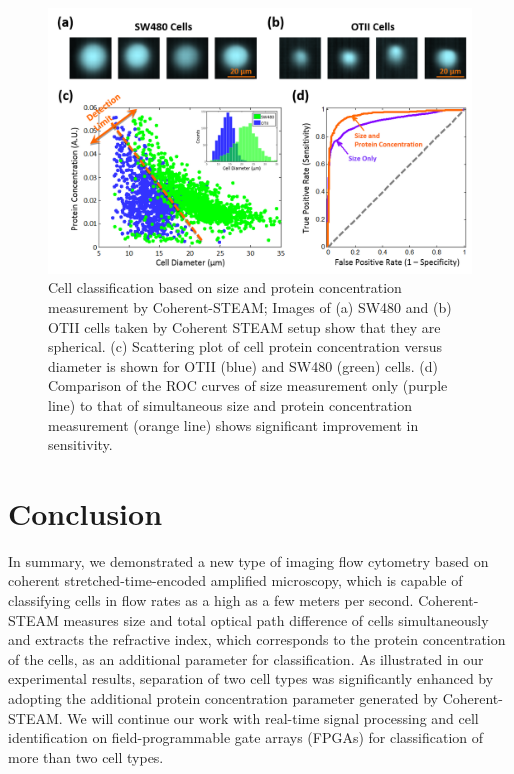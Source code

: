 \begin{figure}[htb!]
\centering
\includegraphics[scale=0.75]{BOE2013/Figure4.png}
\caption{Cell classification based on size and protein concentration measurement by Coherent-STEAM; Images of (a) SW480 and (b) OTII cells taken by Coherent STEAM setup show that they are spherical. (c) Scattering plot of cell protein concentration versus diameter is shown for OTII (blue) and SW480 (green) cells. (d) Comparison of the ROC curves of size measurement only (purple line) to that of simultaneous size and protein concentration measurement (orange line) shows significant improvement in sensitivity.}
\label{fig:BOE2013_Figure4}
\end{figure}

\section{Conclusion}

In summary, we demonstrated a new type of imaging flow cytometry based on coherent stretched-time-encoded amplified microscopy, which is capable of classifying cells in flow rates as a high as a few meters per second. Coherent-STEAM measures size and total optical path difference of cells simultaneously and extracts the refractive index, which corresponds to the protein concentration of the cells, as an additional parameter for classification. As illustrated in our experimental results, separation of two cell types was significantly enhanced by adopting the additional protein concentration parameter generated by Coherent-STEAM. We will continue our work with real-time signal processing and cell identification on field-programmable gate arrays (FPGAs) for classification of more than two cell types.
